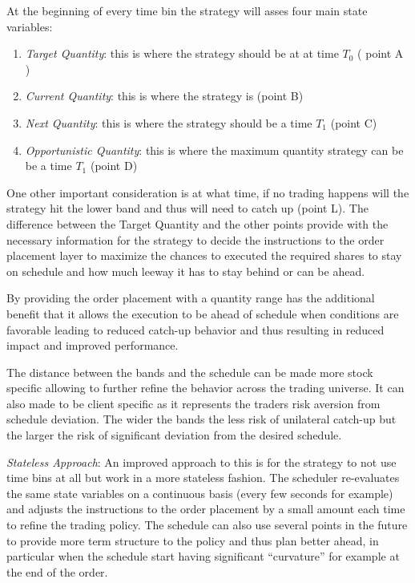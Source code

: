 At the beginning of every time bin the strategy will  asses four main state variables:


\begin{enumerate}
\item\emph{Target Quantity}: this is where the strategy should be at at time $T_0$ ( point A )
\item\emph{ Current Quantity}: this is where the strategy is (point B)
\item\emph{ Next Quantity}: this is where the strategy should be a time $T_1$ (point C)
\item\emph{ Opportunistic Quantity}: this is where the maximum quantity strategy can be be a time $T_1$ (point D)
\end{enumerate}


One other important consideration is at what time, if no trading happens will the strategy hit the lower band and thus will need to catch up (point L). The difference between the Target Quantity and the other points provide with the necessary  information for the strategy to decide the instructions to the order placement layer to maximize the chances to executed the required shares to stay on schedule and how much leeway it has to stay behind or can be ahead.


By providing the order placement with a quantity range has the additional benefit that it allows the execution to be ahead of schedule when conditions are favorable leading to reduced catch-up behavior and thus resulting in reduced impact and improved performance.


The distance between the bands and the schedule can be made more stock specific allowing to further refine the behavior across the trading universe. It can also made to be client specific as it represents the traders risk aversion from schedule deviation. The wider the bands the less risk of unilateral catch-up but the larger the risk of significant deviation from the desired schedule. \twomedskip


\noindent\emph{Stateless Approach}: An improved approach to this is for the strategy to not use time bins at all but work in a more stateless fashion. The scheduler re-evaluates the same state variables on a continuous basis (every few seconds for example) and adjusts the instructions to the order placement by a small amount each time to refine the trading policy. The schedule can also use several points in the future to provide more term structure to the policy and thus plan better ahead, in particular when the schedule start having significant ``curvature'' for example at the end of the order. \twomedskip


